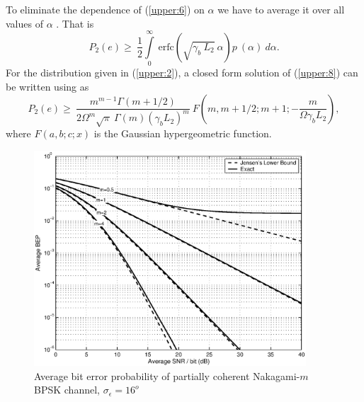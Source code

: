 To eliminate the dependence of (\ref{upper:6}) on $\alpha$ we have
to average it over all values of $\alpha$ . That is
\begin{equation}
\label{upper:8} P_2(e)\ge~\frac{1}{2}
\int\limits_{0}^{\infty}~\mbox{erfc}\left(\sqrt{\gamma_b~L_2}~\alpha\right)p~(\alpha)~d\alpha.
\end{equation}
For the distribution given in (\ref{upper:2}), a closed form
solution of (\ref{upper:8}) can be written using \cite[eq.
6.286.1]{gradeshteyn:1994} as
\begin{equation}
\label{upper:9}
P_2(e)\ge~\frac{m^{m-1}\Gamma(m+1/2)}{2\Omega^m\sqrt\pi~\Gamma(m)\left(\gamma_bL_2\right)^m}~
F\left(m,m+1/2;m+1;-\frac{m}{\Omega\gamma_bL_2}\right),
\end{equation}
where $F(a,b;c;x)$  is the Gaussian hypergeometric function.
\begin{figure}[tbp]
\centerline{\includegraphics[width=4in]{./upper001.eps}} 
\caption[]
{Average bit error probability of partially coherent Nakagami-$m$ BPSK channel, $\sigma_\epsilon=16^o$}
\end{figure}

